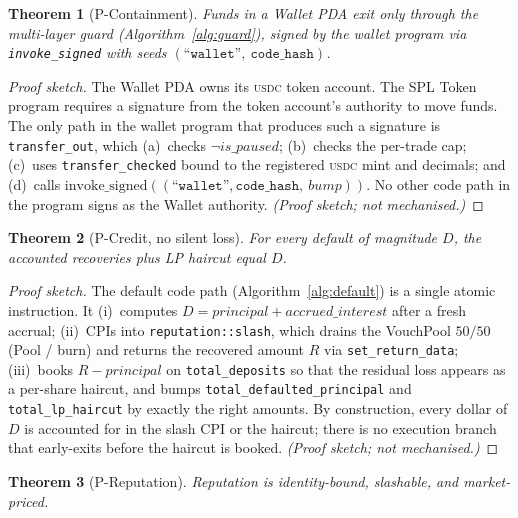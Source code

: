 \documentclass[10pt,conference,letterpaper]{IEEEtran}
\newtheorem{theorem}{Theorem}
\theoremstyle{definition}
\newcommand{\codehash}{\texttt{code\_hash}}
\newcommand{\USDC}{\textsc{usdc}}
\begin{document}
\begin{theorem}[P-Containment]\label{thm:containment}
Funds in a Wallet PDA exit only through the multi-layer guard
(Algorithm~\ref{alg:guard}), signed by the wallet program via
\texttt{invoke\_signed} with seeds $(\texttt{``wallet''},\ \codehash)$.
\end{theorem}

\begin{proof}[Proof sketch]
The Wallet PDA owns its \USDC{} token account. The SPL Token program
\cite{splToken} requires a signature from the token account's
authority to move funds. The only path in the wallet program that
produces such a signature is \texttt{transfer\_out}, which (a)~checks
$\neg\mathit{is\_paused}$; (b)~checks the per-trade cap; (c)~uses
\texttt{transfer\_checked} bound to the registered \USDC{} mint and
decimals; and (d)~calls $\mathrm{invoke\_signed}((\texttt{``wallet''},
\codehash,\ \mathit{bump}))$. No other code path in the program signs
as the Wallet authority. \emph{(Proof sketch; not mechanised.)}
\end{proof}

\begin{theorem}[P-Credit, no silent loss]\label{thm:credit}
For every default of magnitude $D$, the accounted recoveries plus LP
haircut equal $D$.
\end{theorem}

\begin{proof}[Proof sketch]
The default code path (Algorithm~\ref{alg:default}) is a single atomic
instruction. It (i)~computes $D = \mathit{principal} +
\mathit{accrued\_interest}$ after a fresh accrual;
(ii)~CPIs into \texttt{reputation::slash}, which drains the VouchPool
$50/50$ (Pool / burn) and returns the recovered amount $R$ via
\texttt{set\_return\_data}; (iii)~books $R - \mathit{principal}$ on
\texttt{total\_deposits} so that the residual loss appears as a
per-share haircut, and bumps \texttt{total\_defaulted\_principal} and
\texttt{total\_lp\_haircut} by exactly the right amounts. By
construction, every dollar of $D$ is accounted for in the slash CPI or
the haircut; there is no execution branch that early-exits before the
haircut is booked. \emph{(Proof sketch; not mechanised.)}
\end{proof}

\begin{theorem}[P-Reputation]\label{thm:reputation}
Reputation is identity-bound, slashable, and market-priced.
\end{theorem}
\end{document}
